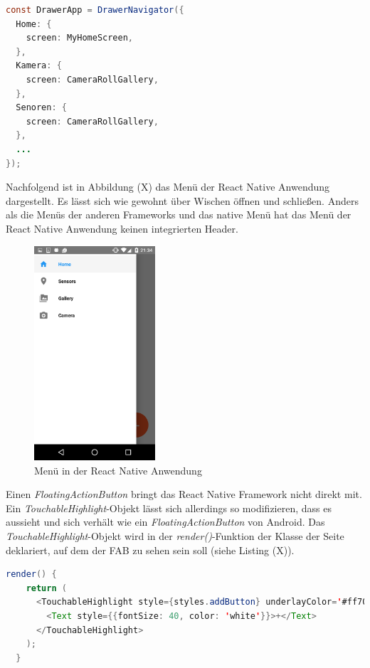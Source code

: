 \begin{lstlisting}[caption=Konfiguration des \textit{DrawerNavigators}, label=lst:DrawerNavigatorConfig, language=Java]
const DrawerApp = DrawerNavigator({
  Home: {
    screen: MyHomeScreen,
  },
  Kamera: {
    screen: CameraRollGallery,
  },
  Senoren: {
    screen: CameraRollGallery,
  },
  ...
});
\end{lstlisting}

Nachfolgend ist in Abbildung (X) das Menü der React Native Anwendung dargestellt. Es lässt sich wie gewohnt über Wischen öffnen und schließen. Anders als die Menüs der anderen Frameworks und das native Menü hat das Menü der React Native Anwendung keinen integrierten Header.

\begin{figure}[h]
	\centering
	\includegraphics[width=0.4\textwidth]{Bilder/Screenshot_20170412-213445.PNG}
	\caption{Menü in der React Native Anwendung}
	\label{fig:MenuXamarin}
\end{figure}
\clearpage

Einen \textit{FloatingActionButton} bringt das React Native Framework nicht direkt mit. Ein \textit{TouchableHighlight}-Objekt lässt sich allerdings so modifizieren, dass es aussieht und sich verhält wie ein \textit{FloatingActionButton} von Android. Das \textit{TouchableHighlight}-Objekt wird in der \textit{render()}-Funktion der Klasse der Seite deklariert, auf dem der FAB zu sehen sein soll (siehe Listing (X)). 

\begin{lstlisting}[caption=Deklaration eines \textit{TouchableHighlight}-Objekts als \textit{FloatingActionButton}, label=lst:FABReactNative, language=Java]
render() {
    return (
      <TouchableHighlight style={styles.addButton} underlayColor='#ff7043' onPress={() => this.props.navigation.navigate('Camera')}>
        <Text style={{fontSize: 40, color: 'white'}}>+</Text>
      </TouchableHighlight>
    );
  }
\end{lstlisting}

